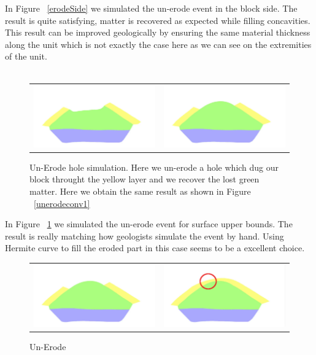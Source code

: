 \documentclass[12pt, a4paper]{report} %
\begin{document}
In Figure ~\ref{erodeSide} we simulated the un-erode event in the block side. The result is quite satisfying, matter is recovered as expected while filling concavities. This result can be improved geologically by ensuring the same material thickness along the unit which is not exactly the case here as we can see on the extremities of the unit.\\\\
\begin{figure}[H]
\centering
\begin{tabular}{@{}cc@{}}
\includegraphics[width=.49\textwidth]{unErodeGap0.png}&
\includegraphics[width=.49\textwidth]{unErodeGap1.png}\\
\end{tabular}
\caption{Un-Erode hole simulation. Here we un-erode a hole which dug our block throught the yellow layer and we recover the lost green matter. Here we obtain the same result as shown in Figure ~\ref{unerodeconv1}}
\label{erodeGap}
\end{figure}
In Figure ~\ref{erodeGap} we simulated the un-erode event for surface upper bounds. The result is really matching how geologists simulate the event by hand. Using Hermite curve to fill the eroded part in this case seems to be a excellent choice.
\begin{figure}[H]
\centering
\begin{tabular}{@{}cc@{}}
\includegraphics[width=.49\textwidth]{unErodeUnits0.png}&
\includegraphics[width=.49\textwidth]{unErodeUnits1.png}\\
\end{tabular}
\caption{Un-Erode}
\label{erodeUnits}
\end{figure}
\end{document}
